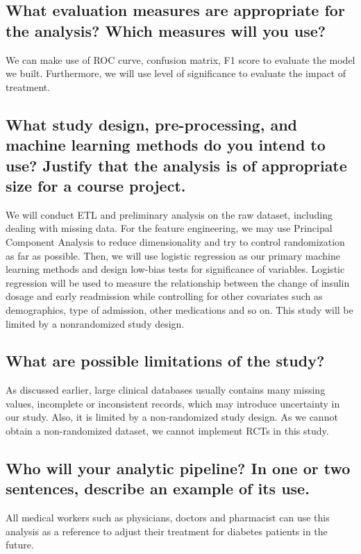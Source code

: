 \documentclass[twoside,11pt]{article}
\begin{document}
\subsection{What evaluation measures are appropriate for the analysis? Which measures will you use?}
We can make use of ROC curve, confusion matrix, F1 score to evaluate the model we built. Furthermore, we will use level of significance to evaluate the impact of treatment.

\subsection{What study design, pre-processing, and machine learning methods do you intend to use? Justify that the analysis is of appropriate size for a course project.}
We will conduct ETL and preliminary analysis on the raw dataset, including dealing with missing data. For the feature engineering, we may use Principal Component Analysis to reduce dimensionality and try to control randomization as far as possible. Then, we will use logistic regression as our primary machine learning methods and design low-bias tests for significance of variables. Logistic regression will be used to measure the relationship between the change of insulin dosage and early readmission while controlling for other covariates such as demographics, type of admission, other medications and so on. This study will be limited by a nonrandomized study design.

\subsection{What are possible limitations of the study?}
As discussed earlier, large clinical databases usually contains many missing values, incomplete or inconsistent records, which may introduce uncertainty in our study. Also, it is limited by a non-randomized study design. As we cannot obtain a non-randomized dataset, we cannot implement RCTs in this study.

\subsection{Who will your analytic pipeline? In one or two sentences, describe an example of its use.}
All medical workers such as physicians, doctors and pharmacist can use this analysis as a reference to adjust their treatment for diabetes patients in the future.


\end{document}
